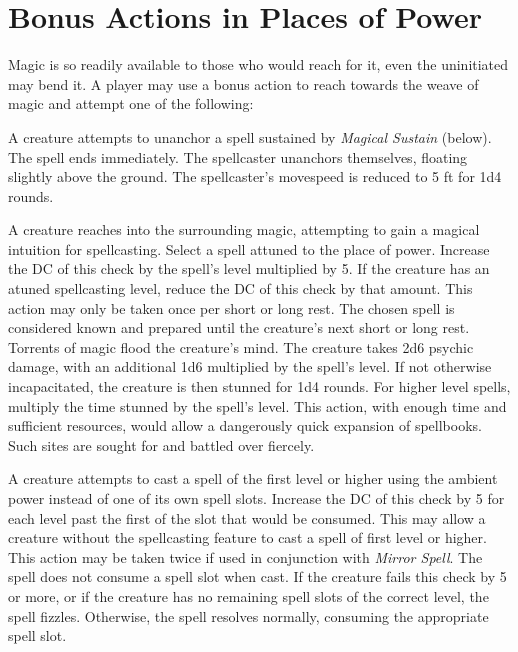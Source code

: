   \section*{Bonus Actions in Places of Power}

  Magic is so readily available to those who would reach for it, even
  the uninitiated may bend it.  A player may use a bonus action to
  reach towards the weave of magic and attempt one of the following:

 A creature attempts to unanchor a spell
sustained by {\it Magical Sustain} (below).  \success The spell ends
immediately.  \failure The spellcaster unanchors themselves, floating
slightly above the ground.  The spellcaster's movespeed is reduced to
5 ft for 1d4 rounds.

 A creature reaches into the
surrounding magic, attempting to gain a magical intuition for
spellcasting.  Select a spell attuned to the place of power.  Increase
the DC of this check by the spell's level multiplied by 5.  If the
creature has an atuned spellcasting level, reduce the DC of this check
by that amount.  This action may only be taken once per short or long
rest.  \success The chosen spell is considered known and prepared
until the creature's next short or long rest.  \failure Torrents of
magic flood the creature's mind.  The creature takes 2d6 psychic
damage, with an additional 1d6 multiplied by the spell's level.  If
not otherwise incapacitated, the creature is then stunned for 1d4
rounds.  For higher level spells, multiply the time stunned by the
spell's level.  \note This action, with enough time and sufficient
resources, would allow a dangerously quick expansion of spellbooks.
Such sites are sought for and battled over fiercely.

 \attuned A creature attempts to cast a
spell of the first level or higher using the ambient power instead of
one of its own spell slots.  Increase the DC of this check by 5 for
each level past the first of the slot that would be consumed.  This
may allow a creature without the spellcasting feature to cast a spell
of first level or higher.  This action may be taken twice if used in
conjunction with {\it Mirror Spell}.  \success The spell does not
consume a spell slot when cast.  \failure If the creature fails this
check by 5 or more, or if the creature has no remaining spell slots of
the correct level, the spell fizzles.  Otherwise, the spell resolves
normally, consuming the appropriate spell slot.
  
